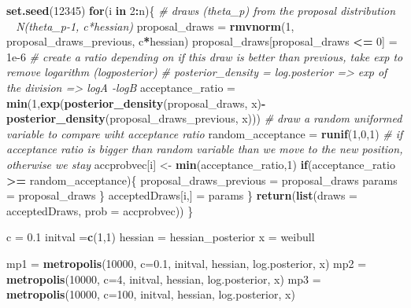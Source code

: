 \documentclass[
]{article}
\newenvironment{Shaded}{\begin{snugshade}}{\end{snugshade}}
\newcommand{\CommentTok}[1]{\textcolor[rgb]{0.56,0.35,0.01}{\textit{#1}}}
\newcommand{\ControlFlowTok}[1]{\textcolor[rgb]{0.13,0.29,0.53}{\textbf{#1}}}
\newcommand{\DataTypeTok}[1]{\textcolor[rgb]{0.13,0.29,0.53}{#1}}
\newcommand{\DecValTok}[1]{\textcolor[rgb]{0.00,0.00,0.81}{#1}}
\newcommand{\FloatTok}[1]{\textcolor[rgb]{0.00,0.00,0.81}{#1}}
\newcommand{\KeywordTok}[1]{\textcolor[rgb]{0.13,0.29,0.53}{\textbf{#1}}}
\newcommand{\NormalTok}[1]{#1}
\newcommand{\OperatorTok}[1]{\textcolor[rgb]{0.81,0.36,0.00}{\textbf{#1}}}
\newcommand{\StringTok}[1]{\textcolor[rgb]{0.31,0.60,0.02}{#1}}
\begin{document}
\begin{Shaded}
\begin{Highlighting}[]
{{  \KeywordTok{set.seed}\NormalTok{(}\DecValTok{12345}\NormalTok{)}
  \ControlFlowTok{for}\NormalTok{(i }\ControlFlowTok{in} \DecValTok{2}\OperatorTok{:}\NormalTok{n)\{}
    \CommentTok{# draws (theta_p) from the proposal distribution ~ N(theta_p-1, c*hessian)}
\NormalTok{    proposal_draws =}\StringTok{ }\KeywordTok{rmvnorm}\NormalTok{(}\DecValTok{1}\NormalTok{, proposal_draws_previous, c}\OperatorTok{*}\NormalTok{hessian)}
\NormalTok{    proposal_draws[proposal_draws }\OperatorTok{<=}\StringTok{ }\DecValTok{0}\NormalTok{] =}\StringTok{ }\FloatTok{1e-6}
    \CommentTok{# create a ratio depending on if this draw is better than previous, take exp to remove logarithm (logposterior)}
    \CommentTok{# posterior_density = log.posterior => exp of the division => logA -logB }
\NormalTok{    acceptance_ratio =}\StringTok{ }\KeywordTok{min}\NormalTok{(}\DecValTok{1}\NormalTok{,}\KeywordTok{exp}\NormalTok{(}\KeywordTok{posterior_density}\NormalTok{(proposal_draws, x)}\OperatorTok{-}\KeywordTok{posterior_density}\NormalTok{(proposal_draws_previous, x)))}
    \CommentTok{# draw a random uniformed variable to compare wiht acceptance ratio}
\NormalTok{    random_acceptance =}\StringTok{ }\KeywordTok{runif}\NormalTok{(}\DecValTok{1}\NormalTok{,}\DecValTok{0}\NormalTok{,}\DecValTok{1}\NormalTok{)}
    \CommentTok{# if acceptance ratio is bigger than random variable than we move to the new position, otherwise we stay}
\NormalTok{    accprobvec[i] <-}\StringTok{ }\KeywordTok{min}\NormalTok{(acceptance_ratio,}\DecValTok{1}\NormalTok{)}
    \ControlFlowTok{if}\NormalTok{(acceptance_ratio }\OperatorTok{>=}\StringTok{ }\NormalTok{random_acceptance)\{}
\NormalTok{      proposal_draws_previous =}\StringTok{ }\NormalTok{proposal_draws}
\NormalTok{      params =}\StringTok{ }\NormalTok{proposal_draws}
\NormalTok{    \}}
\NormalTok{    acceptedDraws[i,] =}\StringTok{ }\NormalTok{params}
\NormalTok{  \}}
  \KeywordTok{return}\NormalTok{(}\KeywordTok{list}\NormalTok{(}\DataTypeTok{draws =}\NormalTok{ acceptedDraws, }\DataTypeTok{prob =}\NormalTok{ accprobvec))}
\NormalTok{\}}

\NormalTok{c =}\StringTok{ }\FloatTok{0.1}
\NormalTok{initval =}\KeywordTok{c}\NormalTok{(}\DecValTok{1}\NormalTok{,}\DecValTok{1}\NormalTok{)}
\NormalTok{hessian =}\StringTok{ }\NormalTok{hessian_posterior}
\NormalTok{x =}\StringTok{ }\NormalTok{weibull}

\NormalTok{mp1 =}\StringTok{ }\KeywordTok{metropolis}\NormalTok{(}\DecValTok{10000}\NormalTok{, }\DataTypeTok{c=}\FloatTok{0.1}\NormalTok{, initval, hessian, log.posterior, x)}
\NormalTok{mp2 =}\StringTok{ }\KeywordTok{metropolis}\NormalTok{(}\DecValTok{10000}\NormalTok{, }\DataTypeTok{c=}\DecValTok{4}\NormalTok{, initval, hessian, log.posterior, x)}
\NormalTok{mp3 =}\StringTok{ }\KeywordTok{metropolis}\NormalTok{(}\DecValTok{10000}\NormalTok{, }\DataTypeTok{c=}\DecValTok{100}\NormalTok{, initval, hessian, log.posterior, x)}



}}
\end{Highlighting}
\end{Shaded}
\end{document}
